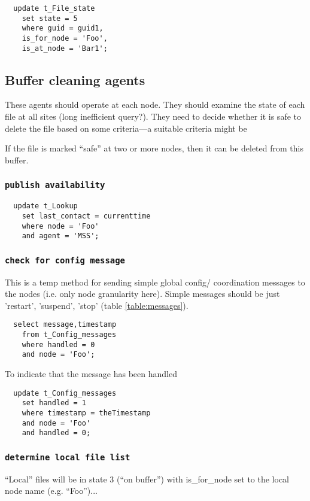 \documentclass{cmspaper}
\begin{document}
{\small\begin{verbatim}
  update t_File_state
    set state = 5
    where guid = guid1,
    is_for_node = 'Foo',
    is_at_node = 'Bar1';
\end{verbatim}}


\subsection{Buffer cleaning agents}

These agents should operate at each node. They should examine the
state of each file at all sites (long inefficient query?). They need
to decide whether it is safe to delete the file based on some
criteria---a suitable criteria might be

If the file is marked ``safe'' at two or more nodes, then it can be
deleted from this buffer.

\subsubsection{\textbf{\texttt{publish availability}}}

{\small\begin{verbatim}
  update t_Lookup
    set last_contact = currenttime
    where node = 'Foo'
    and agent = 'MSS';
\end{verbatim}}

\subsubsection{\textbf{\texttt{check for config message}}}
This is a temp method for sending simple global config/ coordination messages to the nodes (i.e. only node granularity here). Simple messages should be just 'restart', 'suspend', 'stop' (table \ref{table:messages}).

{\small\begin{verbatim}
  select message,timestamp
  	from t_Config_messages
  	where handled = 0
  	and node = 'Foo';
\end{verbatim}}

To indicate that the message has been handled

{\small\begin{verbatim}
  update t_Config_messages
  	set handled = 1
  	where timestamp = theTimestamp
  	and node = 'Foo'
  	and handled = 0;
\end{verbatim}}

\subsubsection{\textbf{\texttt{determine local file list}}}
``Local'' files will be in state 3 (``on buffer'') with is\_for\_node set to the local node name (e.g. ``Foo'')...
\end{document}
